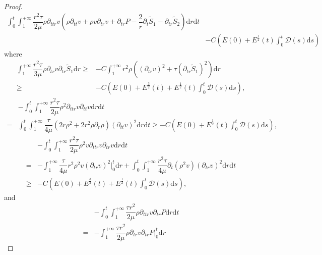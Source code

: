 \documentclass[10pt,reqno]{amsart}
\numberwithin{equation}{section}
\begin{document}
\begin{proof}
\begin{align}
				\int_{0}^{t}\int_{1}^{+\infty}\dfrac{r^2\tau}{2\mu}\rho\partial_{ttr} v(\rho\partial_{tt} v+\rho v\partial_{tr} v+\partial_{tr} P-\dfrac{2}{r} \partial_t \tilde{S}_1
				-\partial_{tr} \tilde{S}_2)\mathrm{d}r\mathrm{d}t \nonumber \\
				&-C\left(E(0)+ E^{\frac{1}{2}}(t) \int_{0}^{t}\mathcal{D}(s)\mathrm{d}s\right)
			\end{align}
		where 
		\begin{equation}\nonumber
			\begin{aligned}
				\int_{1}^{+\infty}\dfrac{r^2\tau}{3\mu}\rho\partial_{tr} v\partial_{tr} \tilde{S}_1\mathrm{d}r\geq&-C\int_{1}^{+\infty}r^2\rho ((\partial_{tr} v)^2+\tau(\partial_{tr} \tilde{S}_1)^2)\mathrm{d}r\\
				\geq&-C\left(E(0)+ E^{\frac{3}{2}}(t)+ E^{\frac{1}{2}}(t) \int_{0}^{t}\mathcal{D}(s)\mathrm{d}s\right),
			\end{aligned}
		\end{equation}
		\begin{equation}\nonumber
			\begin{aligned}
				&-\int_{0}^{t}\int_{1}^{+\infty}\dfrac{r^2\tau}{2\mu}\rho^2\partial_{ttr} v\partial_{tt} v\mathrm{d}r\mathrm{d}t\\
				=&\int_{0}^{t}\int_{1}^{+\infty}\dfrac{\tau}{4\mu}(2r\rho^2+2r^2\rho
				\partial_{r}\rho)(\partial_{tt}v)^2\mathrm{d}r\mathrm{d}t
				\geq-C\left(E(0)+ E^{\frac{1}{2}}(t) \int_{0}^{t}\mathcal{D}(s)\mathrm{d}s\right),
			\end{aligned}
		\end{equation}
		\begin{align*}
		&-\int_{0}^{t}\int_{1}^{+\infty}\dfrac{r^2\tau}{2\mu}\rho^2v\partial_{ttr} v\partial_{tr} v\mathrm{d}r\mathrm{d}t\\
		=&-\int_{1}^{+\infty}\dfrac{\tau}{4\mu}r^2\rho^2v(\partial_{tr} v)^2\big|_0^t\mathrm{d}r 
		+\int_{0}^{t}\int_{1}^{+\infty}\dfrac{r^2\tau}{4\mu}\partial_{t}(\rho^2v)
		(\partial_{tr} v)^2\mathrm{d}r\mathrm{d}t\\
		\geq&-C\left(E(0)+ E^{\frac{3}{2}}(t)+ E^{\frac{1}{2}}(t) \int_{0}^{t}\mathcal{D}(s)\mathrm{d}s\right),
		\end{align*}
		and 
			\begin{align*}
				&-\int_{0}^{t}\int_{1}^{+\infty}\dfrac{\tau r^2}{2\mu}\rho\partial_{ttr} v\partial_{tr} P\mathrm{d}r\mathrm{d}t\\
				=&-\int_{1}^{+\infty}\dfrac{\tau r^2} {2\mu} \rho\partial_{tr} v\partial_{tr} P\big|_0^t\mathrm{d}r 

\end{align*}
\end{proof}
\end{document}
